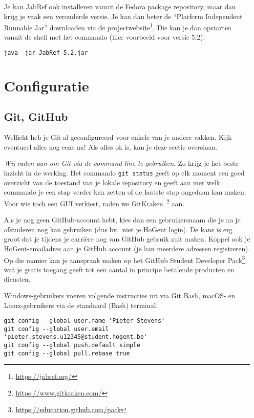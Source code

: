Je kan JabRef ook installeren vanuit de Fedora package repository, maar dan krijg je vaak een verouderde versie. Je kan dan beter de ``Platform Independent Runnable Jar'' downloaden via de projectwebsite\footnote{\url{https://jabref.org/}}. Die kan je dan opstarten vanuit de shell met het commando (hier voorbeeld voor versie 5.2):

\begin{verbatim}
java -jar JabRef-5.2.jar
\end{verbatim}

\section{Configuratie}

\subsection{Git, GitHub}

Wellicht heb je Git al geconfigureerd voor enkele van je andere vakken. Kijk eventueel alles nog eens na! Als alles ok is, kan je deze sectie overslaan.

\emph{Wij raden aan om Git via de command line te gebruiken.} Zo krijg je het beste inzicht in de werking. Het commando \texttt{git status} geeft op elk moment een goed overzicht van de toestand van je lokale repository en geeft aan met welk commando je een stap verder kan zetten of de laatste stap ongedaan kan maken. Voor wie toch een GUI verkiest, raden we GitKraken~\footnote{\url{https://www.gitkraken.com/}} aan.

Als je nog geen GitHub-account hebt, kies dan een gebruikersnaam die je na je afstuderen nog kan gebruiken (dus bv.~niet je HoGent login). De kans is erg groot dat je tijdens je carrière nog van GitHub gebruik zult maken. Koppel ook je HoGent-emailadres aan je GitHub account (je kan meerdere adressen registreren). Op die manier kan je aanspraak maken op het GitHub Student Developer Pack\footnote{\url{https://education.github.com/pack}}, wat je gratis toegang geeft tot een aantal in principe betalende producten en diensten.

Windows-gebruikers voeren volgende instructies uit via Git Bash, macOS- en Linux-gebruikers via de standaard (Bash) terminal.

\begin{verbatim}
git config --global user.name 'Pieter Stevens'
git config --global user.email 'pieter.stevens.u12345@student.hogent.be'
git config --global push.default simple
git config --global pull.rebase true
\end{verbatim}

